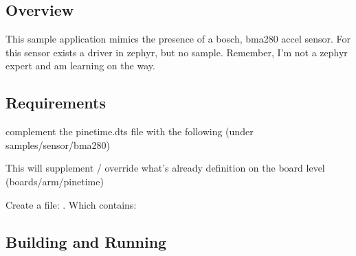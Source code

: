 \documentclass[letterpaper,10pt,english]{sphinxmanual}
\begin{document}
\subsection{Overview}
\label{\detokenize{behind/bma280:overview}}
This sample application mimics the presence of a bosch, bma280 accel sensor.
For this sensor exists a driver in zephyr, but no sample.
Remember, I’m not a zephyr expert and am learning on the way.


\subsection{Requirements}
\label{\detokenize{behind/bma280:requirements}}
complement the pinetime.dts file with the following (under samples/sensor/bma280)

This will supplement / override what’s already definition on the board level (boards/arm/pinetime)

\begin{sphinxVerbatim}[commandchars=\\\{\}]
\end{sphinxVerbatim}

Create a file: .
Which contains:

\begin{sphinxVerbatim}[commandchars=\\\{\}]
 
 
        
        
\end{sphinxVerbatim}


\subsection{Building and Running}
\label{\detokenize{behind/bma280:building-and-running}}
\end{document}
